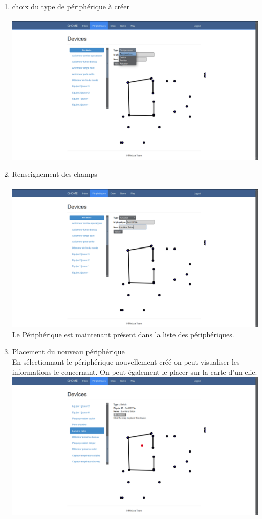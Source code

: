 \begin{enumerate}
\item choix du type de périphérique à créer\\
~~\\
\includegraphics[scale=0.25]{image/periphChoice.png}\\
\item Renseignement des champs \\
~~\\
\includegraphics[scale=0.25]{image/formPeriph.png}\\
Le Périphérique est maintenant présent dans la liste des périphériques.
\item Placement du nouveau périphérique\\
En sélectionnant le périphérique nouvellement créé on peut visualiser les informations le concernant. On peut également le placer sur la carte d'un clic.\\
\includegraphics[scale=0.25]{image/placePeriph.png}
\end{enumerate}
